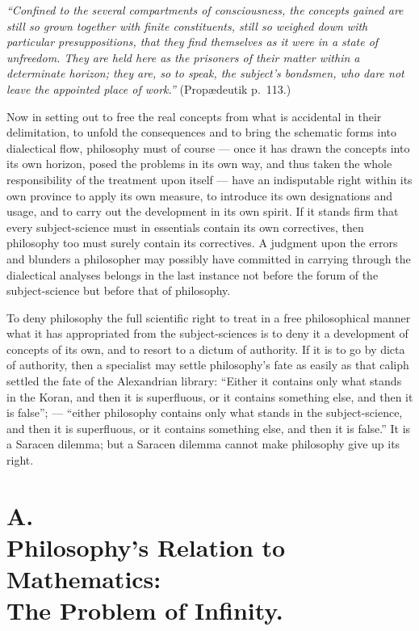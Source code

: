 \documentclass[12pt,a4paper]{book}
\begin{document}
\emph{``Confined to the several compartments of consciousness, the concepts
gained are still so grown together with finite constituents, still so weighed
down with particular presuppositions, that they find themselves as it were in a
state of unfreedom. They are held here as the prisoners of their matter within
a determinate horizon; they are, so to speak, the subject's bondsmen, who dare
not leave the appointed place of work.''} (Propædeutik p.~113.)

Now in setting out to free the real concepts from what is accidental in their
delimitation, to unfold the consequences and to bring the schematic forms into
dialectical flow, philosophy must
of course --- once it has drawn the concepts into its own horizon, posed the
problems in its own way, and thus taken the whole responsibility of the
treatment upon itself --- have an indisputable right within its own province to
apply its own measure, to introduce its own designations and usage, and to
carry out the development in its own spirit. If it stands firm that every
subject-science must in essentials contain its own correctives, then philosophy
too must surely contain its correctives. A judgment upon the errors and
blunders a philosopher may possibly have committed in carrying through the
dialectical analyses belongs in the last instance not before the forum of the
subject-science but before that of philosophy.

To deny philosophy the full scientific right to treat in a free philosophical
manner what it has appropriated from the subject-sciences is to deny it a
development of concepts of its own, and to resort to a dictum of authority. If
it is to go by dicta of authority, then a specialist may settle philosophy's
fate as easily as that caliph settled the fate of the Alexandrian library:
``Either it contains only what stands in the Koran, and then it is superfluous,
or it contains something else, and then it is false''; --- ``either philosophy
contains only what stands in the subject-science, and then it is superfluous,
or it contains something else, and then it is false.'' It is a Saracen dilemma;
but a Saracen dilemma cannot make philosophy give up its right.


\section*{A.\\ Philosophy's Relation to Mathematics:\\
  The Problem of Infinity.}
\end{document}
